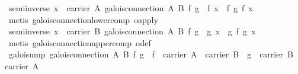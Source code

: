 \begin{isabellebody}
\endisatagproof
{\isafoldproof}%
%
\isadelimproof
\isanewline
%
\endisadelimproof
\isanewline
{}\isamarkupfalse%
\ semi{}inverse{}{}\ {}{}x\ {}\ carrier\ A{}\ galois{}connection\ A\ B\ f\ g{}\ {}\ f\ x\ {}\ f\ {}g\ {}f\ x{}{}{}\isanewline
%
\isadelimproof
\ \ %
\endisadelimproof
%
\isatagproof
{}\isamarkupfalse%
\ {}metis\ galois{}connection{}lower{}comp\ o{}apply{}%
\endisatagproof
{\isafoldproof}%
%
\isadelimproof
\isanewline
%
\endisadelimproof
\isanewline
{}\isamarkupfalse%
\ semi{}inverse{}{}\ {}{}x\ {}\ carrier\ B{}\ galois{}connection\ A\ B\ f\ g{}\ {}\ g\ x\ {}\ g\ {}f\ {}g\ x{}{}{}\isanewline
%
\isadelimproof
\ \ %
\endisadelimproof
%
\isatagproof
{}\isamarkupfalse%
\ {}metis\ galois{}connection{}upper{}comp\ o{}def{}%
\endisatagproof
{\isafoldproof}%
%
\isadelimproof
\isanewline
%
\endisadelimproof
\isanewline
{}\isamarkupfalse%
\ galois{}ump{}{}\ {}galois{}connection\ A\ B\ f\ g\ {}\ {}f\ {}\ carrier\ A\ {}\ carrier\ B\ {}\ g\ {}\ carrier\ B\ {}\ carrier\ A\isanewline

\end{isabellebody}
